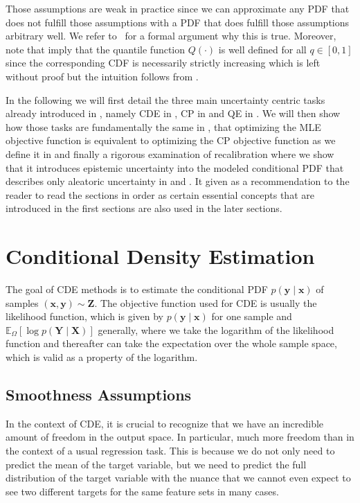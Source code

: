 Those assumptions are weak in practice since we can approximate any PDF that does not fulfill those assumptions with a PDF that does fulfill those assumptions arbitrary well. We refer to~\cite{klenke2013probability} for a formal argument why this is true. Moreover, note that  imply that the quantile function $Q(\cdot)$ is well defined for all $q\in[0,1]$ since the corresponding CDF is necessarily strictly increasing which is left without proof but the intuition follows from .

In the following we will first detail the three main uncertainty centric tasks already introduced in , namely CDE in , CP in  and QE in . We will then show how those tasks are fundamentally the same in , that optimizing the MLE objective function is equivalent to optimizing the CP objective function as we define it in  and finally a rigorous examination of recalibration where we show that it introduces epistemic uncertainty into the modeled conditional PDF that describes only aleatoric uncertainty in  and . It given as a recommendation to the reader to read the sections in order as certain essential concepts that are introduced in the first sections are also used in the later sections.

\section{Conditional Density Estimation}\label{sec:cde}

The goal of CDE methods is to estimate the conditional PDF $p(\mathbf{y}\mid \mathbf{x})$ of samples $(\mathbf{x}, \mathbf{y}) \sim \mathbf{Z}$. The objective function used for CDE is usually the likelihood function, which is given by $p(\mathbf{y}\mid \mathbf{x})$ for one sample and $\mathbb{E}_{\Omega}\left[\log p(\mathbf{Y} \mid \mathbf{X})\right]$ generally, where we take the logarithm of the likelihood function and thereafter can take the expectation over the whole sample space, which is valid as a property of the logarithm.

\subsection{Smoothness Assumptions}\label{sec:smoothness}
In the context of CDE, it is crucial to recognize that we have an incredible amount of freedom in the output space. In particular, much more freedom than in the context of a usual regression task. This is because we do not only need to predict the mean of the target variable, but we need to predict the full distribution of the target variable with the nuance that we cannot even expect to see two different targets for the same feature sets in many cases.

